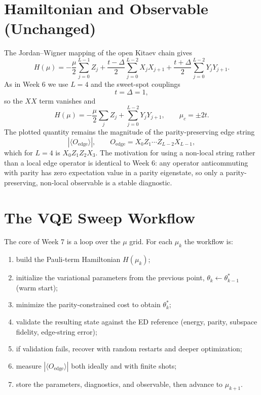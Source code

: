 \documentclass[11pt]{article}
\newcommand{\Oedge}{X_0 Z_1\cdots Z_{L-2} X_{L-1}}
\begin{document}
\section{Hamiltonian and Observable (Unchanged)}

The Jordan--Wigner mapping of the open Kitaev chain gives
\begin{equation}
  H(\mu)
  = -\frac{\mu}{2}\sum_{j=0}^{L-1} Z_j
    + \frac{t-\Delta}{2}\sum_{j=0}^{L-2} X_jX_{j+1}
    + \frac{t+\Delta}{2}\sum_{j=0}^{L-2} Y_jY_{j+1}.
\end{equation}
As in Week 6 we use $L=4$ and the sweet-spot couplings
\begin{equation}
  t=\Delta=1,
\end{equation}
so the $XX$ term vanishes and
\begin{equation}
  H(\mu) = -\frac{\mu}{2}\sum_j Z_j + \sum_{j=0}^{L-2} Y_jY_{j+1},
  \qquad \mu_c = \pm 2t.
\end{equation}
The plotted quantity remains the magnitude of the parity-preserving edge string
\begin{equation}
  |\langle O_{\mathrm{edge}}\rangle|, \qquad O_{\mathrm{edge}}=\Oedge,
\end{equation}
which for $L=4$ is $X_0 Z_1 Z_2 X_3$. The motivation for using a non-local string rather than a local edge operator is identical to Week 6: any operator anticommuting with parity has zero expectation value in a parity eigenstate, so only a parity-preserving, non-local observable is a stable diagnostic.

\section{The VQE Sweep Workflow}

The core of Week 7 is a loop over the $\mu$ grid. For each $\mu_k$ the workflow is:
\begin{enumerate}
  \item build the Pauli-term Hamiltonian $H(\mu_k)$;
  \item initialize the variational parameters from the previous point, $\theta_k \leftarrow \theta_{k-1}^{*}$ (warm start);
  \item minimize the parity-constrained cost to obtain $\theta_k^{*}$;
  \item validate the resulting state against the ED reference (energy, parity, subspace fidelity, edge-string error);
  \item if validation fails, recover with random restarts and deeper optimization;
  \item measure $|\langle O_{\mathrm{edge}}\rangle|$ both ideally and with finite shots;
  \item store the parameters, diagnostics, and observable, then advance to $\mu_{k+1}$.
\end{enumerate}
\end{document}

